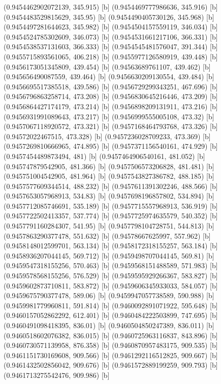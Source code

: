 {{{(0.9454462902072139, 345.915) [b] 
(0.9454469777986636, 345.916) [b] 
(0.9454483529815629, 345.95) [b] 
(0.9454490405730126, 345.968) [b] 
(0.9454497281644623, 345.982) [b] 
(0.9454504157559119, 346.034) [b] 
(0.9454524785302609, 346.073) [b] 
(0.9454531661217106, 366.331) [b] 
(0.9454538537131603, 366.333) [b] 
(0.9454545481576047, 391.344) [b] 
(0.9455715893561065, 406.218) [b] 
(0.9455977126580919, 439.448) [b] 
(0.9456173051345809, 439.454) [b] 
(0.94563689761107, 439.462) [b] 
(0.945656490087559, 439.464) [b] 
(0.9456630209130554, 439.484) [b] 
(0.9456695517385518, 439.586) [b] 
(0.9456729299343251, 467.696) [b] 
(0.9456796863258714, 473.208) [b] 
(0.9456830645216446, 473.209) [b] 
(0.9456864427174179, 473.214) [b] 
(0.9456898209131911, 473.216) [b] 
(0.9456931991089643, 473.217) [b] 
(0.9456999555005108, 473.32) [b] 
(0.9457067118920572, 473.321) [b] 
(0.9457168464793768, 473.326) [b] 
(0.94572022467515, 473.328) [b] 
(0.9457236028709233, 473.369) [b] 
(0.9457269810666965, 474.895) [b] 
(0.9457371156540161, 474.929) [b] 
(0.9457454489873494, 481) [b] 
(0.9457464906540161, 481.052) [b] 
(0.945747879542905, 481.366) [b] 
(0.9457506573206828, 481.481) [b] 
(0.945751004542905, 481.964) [b] 
(0.9457543827386782, 488.185) [b] 
(0.9457577609344514, 488.232) [b] 
(0.9457611391302246, 488.566) [b] 
(0.9457653057968913, 534.83) [b] 
(0.9457698196857802, 534.894) [b] 
(0.9457712085746691, 535.189) [b] 
(0.9457715557968913, 536.919) [b] 
(0.9457722502413357, 537.774) [b] 
(0.9457725974635579, 540.352) [b] 
(0.9457791160284307, 541.95) [b] 
(0.9457798104728751, 544.813) [b] 
(0.9457863290377478, 551.632) [b] 
(0.94578667625997, 557.962) [b] 
(0.9458148012599701, 563.134) [b] 
(0.9458172318155257, 563.184) [b] 
(0.9458936207044145, 569.712) [b] 
(0.9459498707044145, 569.81) [b] 
(0.9459547318155256, 570.463) [b] 
(0.9459568151488589, 571.983) [b] 
(0.9459578568155256, 576.529) [b] 
(0.9459595929266367, 583.827) [b] 
(0.9459602873710811, 583.872) [b] 
(0.9459606345933033, 584.057) [b] 
(0.9459675790377478, 589.06) [b] 
(0.9459947057738589, 590.988) [b] 
(0.9459981779960811, 591.814) [b] 
(0.9460092891071922, 595.648) [b] 
(0.9460157052862292, 612.401) [b] 
(0.9460484222503899, 747.695) [b] 
(0.9460491098418395, 836.01) [b] 
(0.9460504850247389, 836.011) [b] 
(0.9460518602076382, 836.015) [b] 
(0.9460725963116837, 843.896) [b] 
(0.9460730571139958, 876.358) [b] 
(0.9460870957483175, 909.535) [b] 
(0.9461151730169608, 909.566) [b] 
(0.9461292116512825, 909.667) [b] 
(0.9461432502856042, 909.676) [b] 
(0.9461572889199259, 909.793) [b] 
(0.9461713275542476, 909.986) [b] 
}}}
